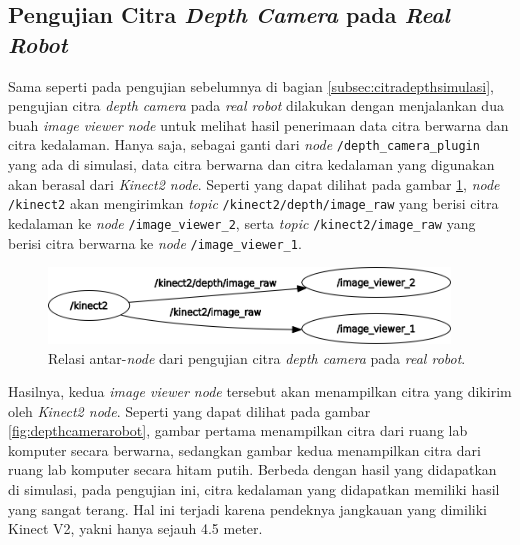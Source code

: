 \subsection{Pengujian Citra \emph{Depth Camera} pada \emph{Real Robot}}
\label{subsec:citradepthrobot}

Sama seperti pada pengujian sebelumnya di bagian \ref{subsec:citradepthsimulasi},
  pengujian citra \emph{depth camera} pada \emph{real robot} dilakukan dengan menjalankan dua buah \emph{image viewer node} untuk melihat hasil penerimaan data citra berwarna dan citra kedalaman.
Hanya saja, sebagai ganti dari \emph{node} \lstinline{/depth_camera_plugin} yang ada di simulasi,
  data citra berwarna dan citra kedalaman yang digunakan akan berasal dari \emph{Kinect2 node}.
Seperti yang dapat dilihat pada gambar \ref{fig:rosgraphdepthcamera},
  \emph{node} \lstinline{/kinect2} akan mengirimkan \emph{topic} \lstinline{/kinect2/depth/image_raw} yang berisi citra kedalaman ke \emph{node} \lstinline{/image_viewer_2},
  serta \emph{topic} \lstinline{/kinect2/image_raw} yang berisi citra berwarna ke \emph{node} \lstinline{/image_viewer_1}.

\begin{figure}[ht]
  \centering
  \includegraphics[width=0.95\textwidth,keepaspectratio]{gambar/rosgraph-depth-camera.png}
  \caption{Relasi antar-\emph{node} dari pengujian citra \emph{depth camera} pada \emph{real robot}.}
  \label{fig:rosgraphdepthcamera}
\end{figure}

Hasilnya, kedua \emph{image viewer node} tersebut akan menampilkan citra yang dikirim oleh \emph{Kinect2 node}.
Seperti yang dapat dilihat pada gambar \ref{fig:depthcamerarobot},
  gambar pertama menampilkan citra dari ruang lab komputer secara berwarna,
  sedangkan gambar kedua menampilkan citra dari ruang lab komputer secara hitam putih.
Berbeda dengan hasil yang didapatkan di simulasi, pada pengujian ini,
  citra kedalaman yang didapatkan memiliki hasil yang sangat terang.
Hal ini terjadi karena pendeknya jangkauan yang dimiliki Kinect V2, yakni hanya sejauh 4.5 meter.

